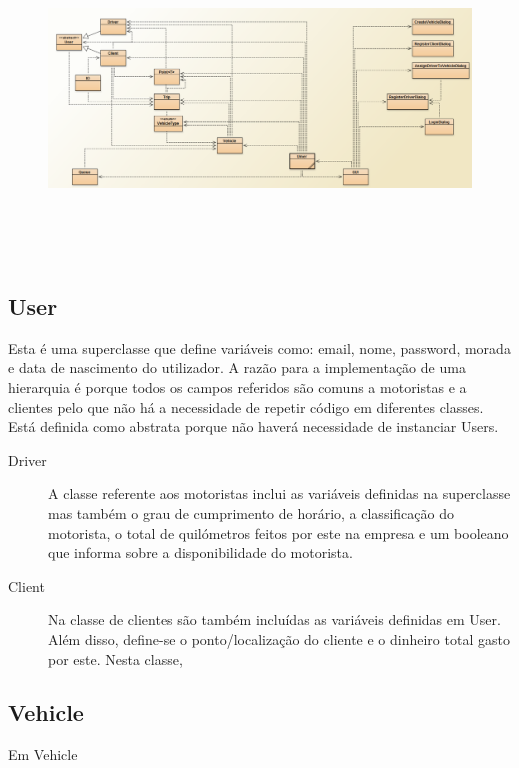 \documentclass[a4paper]{article}
\begin{document}
\begin{figure}[htbp]
    \centering
    \includegraphics[width = 420pt, height = 240pt]{lala}
\end{figure}

\pagebreak

\subsection{User}
Esta é uma superclasse que define variáveis como: email, nome, password, morada e data de nascimento do utilizador. A razão para a implementação de uma hierarquia é porque todos os campos referidos são comuns a motoristas e a clientes pelo que não há a necessidade de repetir código em diferentes classes. Está definida como abstrata porque não haverá necessidade de instanciar Users.

\begin{description}
    \item[Driver] A classe referente aos motoristas inclui as variáveis definidas na superclasse mas também o grau de cumprimento de horário, a classificação do motorista, o total de quilómetros feitos por este na empresa e um booleano que informa sobre a disponibilidade do motorista.

    \item[Client] Na classe de clientes são também incluídas as variáveis definidas em User. Além disso, define-se o ponto/localização do cliente e o dinheiro total gasto por este. Nesta classe, 

\end{description}

\subsection{Vehicle}
Em Vehicle
\end{document}
